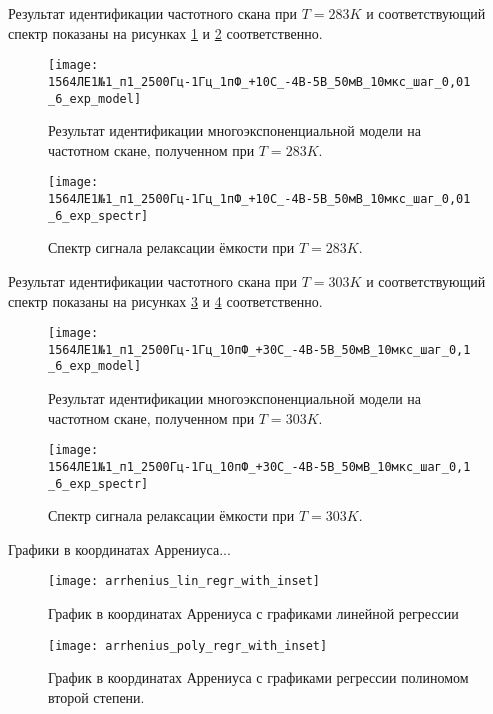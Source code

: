 	Результат идентификации частотного скана при $T=283 K$ и соответствующий
	спектр показаны на рисунках \ref{pic:6_exp_model_283} и 
	\ref{pic:6_exp_spectr_283} соответственно.

	\begin{figure}[!htp]
		\centering
		\texttt{[image: 1564ЛЕ1№1\_п1\_2500Гц-1Гц\_1пФ\_+10С\_-4В-5В\_50мВ\_10мкс\_шаг\_0,01\_6\_exp\_model]}
		\caption{Результат идентификации многоэкспоненциальной модели на 
		частотном скане, полученном при $T=283 K$.}
		\label{pic:6_exp_model_283}
	\end{figure}

	\begin{figure}[!htp]
		\centering
		\texttt{[image: 1564ЛЕ1№1\_п1\_2500Гц-1Гц\_1пФ\_+10С\_-4В-5В\_50мВ\_10мкс\_шаг\_0,01\_6\_exp\_spectr]}
		\caption{Спектр сигнала релаксации ёмкости при $T=283 K$.}
		\label{pic:6_exp_spectr_283}
	\end{figure}



	Результат идентификации частотного скана при $T=303 K$ и соответствующий
	спектр показаны на рисунках \ref{pic:6_exp_model_303} и 
	\ref{pic:6_exp_spectr_303} соответственно.

	\begin{figure}[!htp]
		\centering
		\texttt{[image: 1564ЛЕ1№1\_п1\_2500Гц-1Гц\_10пФ\_+30С\_-4В-5В\_50мВ\_10мкс\_шаг\_0,1\_6\_exp\_model]}
		\caption{Результат идентификации многоэкспоненциальной модели на 
		частотном скане, полученном при $T=303 K$.}
		\label{pic:6_exp_model_303}
	\end{figure}

	\begin{figure}[!htp]
		\centering
		\texttt{[image: 1564ЛЕ1№1\_п1\_2500Гц-1Гц\_10пФ\_+30С\_-4В-5В\_50мВ\_10мкс\_шаг\_0,1\_6\_exp\_spectr]}
		\caption{Спектр сигнала релаксации ёмкости при $T=303 K$.}
		\label{pic:6_exp_spectr_303}
	\end{figure}

	Графики в координатах Аррениуса...

	\begin{figure}[!htp]
		\centering
		\texttt{[image: arrhenius\_lin\_regr\_with\_inset]}
		\caption{График в координатах Аррениуса с графиками линейной регрессии}
		\label{pic:arrhenius_lin_regr_with_inset}
	\end{figure}

	\begin{figure}[!htp]
		\centering
		\texttt{[image: arrhenius\_poly\_regr\_with\_inset]}
		\caption{График в координатах Аррениуса с графиками регрессии
		         полиномом второй степени.}
		\label{pic:arrhenius_poly_regr_with_inset}
	\end{figure}